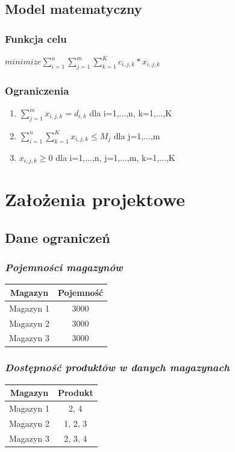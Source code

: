 \documentclass[11pt]{article}
\begin{document}
\subsection{Model matematyczny}
\subsubsection{Funkcja celu}
\begin{center}
$\displaystyle minimize \sum_{i=1}^{n}\sum_{j=1}^{m}\sum_{k=1}^{K} c_{i,j,k}*x_{i,j,k}$
\end{center}
\subsubsection{Ograniczenia}	
	\begin{enumerate}
	\item $\displaystyle \sum_{j=1}^{m} x_{i,j,k}=d_{i,k}$ dla i=1,...,n, k=1,...,K
	\item $\displaystyle \sum_{i=1}^{n}\sum_{k=1}^{K}x_{i,j,k}\le M_j$ dla j=1,...,m
	\item $\displaystyle x_{i,j,k}\ge 0$ dla i=1,...,n, j=1,...,m, k=1,...,K
	\end{enumerate}

\section{Założenia projektowe}
\subsection{Dane ograniczeń}
\subsubsection{\textit{Pojemności magazynów}}
\begin{center}
	\begin{tabular}{ |c|c| } 
		\hline
		 Magazyn & Pojemność\\
		\hline
		Magazyn 1 & 3000  \\ 
		\hline
		Magazyn 2 & 3000  \\ 
		\hline
		Magazyn 3 & 3000  \\ 
		\hline
	\end{tabular}
\end{center}

\subsubsection{\textit{Dostępność produktów w danych magazynach}}
\begin{center}
	\begin{tabular}{ |c|c| } 
		\hline
		Magazyn & Produkt \\
		\hline
		Magazyn 1 & 2, 4  \\ 
		\hline
		Magazyn 2 & 1, 2, 3  \\ 
		\hline
		Magazyn 3 & 2, 3, 4  \\ 
		\hline
	\end{tabular}
\end{center}
\end{document}
